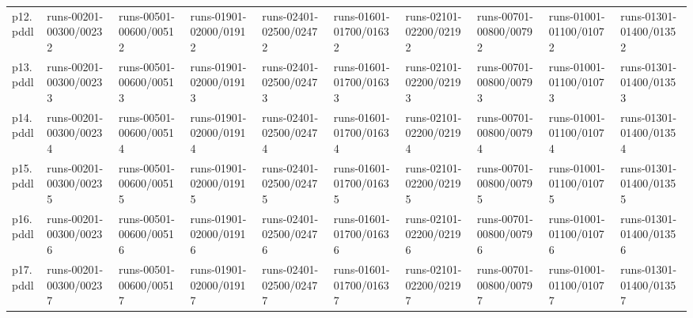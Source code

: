 \documentclass{article}
\begin{document}
\begin{tabular}{@{}lrrrrrrrrr@{}}
p12.pddl & \multicolumn{1}{|l|}{runs-00201-00300/00232} & \multicolumn{1}{|l|}{runs-00501-00600/00512} & \multicolumn{1}{|l|}{runs-01901-02000/01912} & \multicolumn{1}{|l|}{runs-02401-02500/02472} & \multicolumn{1}{|l|}{runs-01601-01700/01632} & \multicolumn{1}{|l|}{runs-02101-02200/02192} & \multicolumn{1}{|l|}{runs-00701-00800/00792} & \multicolumn{1}{|l|}{runs-01001-01100/01072} & \multicolumn{1}{|l|}{runs-01301-01400/01352} \\
p13.pddl & \multicolumn{1}{|l|}{runs-00201-00300/00233} & \multicolumn{1}{|l|}{runs-00501-00600/00513} & \multicolumn{1}{|l|}{runs-01901-02000/01913} & \multicolumn{1}{|l|}{runs-02401-02500/02473} & \multicolumn{1}{|l|}{runs-01601-01700/01633} & \multicolumn{1}{|l|}{runs-02101-02200/02193} & \multicolumn{1}{|l|}{runs-00701-00800/00793} & \multicolumn{1}{|l|}{runs-01001-01100/01073} & \multicolumn{1}{|l|}{runs-01301-01400/01353} \\
p14.pddl & \multicolumn{1}{|l|}{runs-00201-00300/00234} & \multicolumn{1}{|l|}{runs-00501-00600/00514} & \multicolumn{1}{|l|}{runs-01901-02000/01914} & \multicolumn{1}{|l|}{runs-02401-02500/02474} & \multicolumn{1}{|l|}{runs-01601-01700/01634} & \multicolumn{1}{|l|}{runs-02101-02200/02194} & \multicolumn{1}{|l|}{runs-00701-00800/00794} & \multicolumn{1}{|l|}{runs-01001-01100/01074} & \multicolumn{1}{|l|}{runs-01301-01400/01354} \\
p15.pddl & \multicolumn{1}{|l|}{runs-00201-00300/00235} & \multicolumn{1}{|l|}{runs-00501-00600/00515} & \multicolumn{1}{|l|}{runs-01901-02000/01915} & \multicolumn{1}{|l|}{runs-02401-02500/02475} & \multicolumn{1}{|l|}{runs-01601-01700/01635} & \multicolumn{1}{|l|}{runs-02101-02200/02195} & \multicolumn{1}{|l|}{runs-00701-00800/00795} & \multicolumn{1}{|l|}{runs-01001-01100/01075} & \multicolumn{1}{|l|}{runs-01301-01400/01355} \\
p16.pddl & \multicolumn{1}{|l|}{runs-00201-00300/00236} & \multicolumn{1}{|l|}{runs-00501-00600/00516} & \multicolumn{1}{|l|}{runs-01901-02000/01916} & \multicolumn{1}{|l|}{runs-02401-02500/02476} & \multicolumn{1}{|l|}{runs-01601-01700/01636} & \multicolumn{1}{|l|}{runs-02101-02200/02196} & \multicolumn{1}{|l|}{runs-00701-00800/00796} & \multicolumn{1}{|l|}{runs-01001-01100/01076} & \multicolumn{1}{|l|}{runs-01301-01400/01356} \\
p17.pddl & \multicolumn{1}{|l|}{runs-00201-00300/00237} & \multicolumn{1}{|l|}{runs-00501-00600/00517} & \multicolumn{1}{|l|}{runs-01901-02000/01917} & \multicolumn{1}{|l|}{runs-02401-02500/02477} & \multicolumn{1}{|l|}{runs-01601-01700/01637} & \multicolumn{1}{|l|}{runs-02101-02200/02197} & \multicolumn{1}{|l|}{runs-00701-00800/00797} & \multicolumn{1}{|l|}{runs-01001-01100/01077} & \multicolumn{1}{|l|}{runs-01301-01400/01357} \\

\end{tabular}
\end{document}
